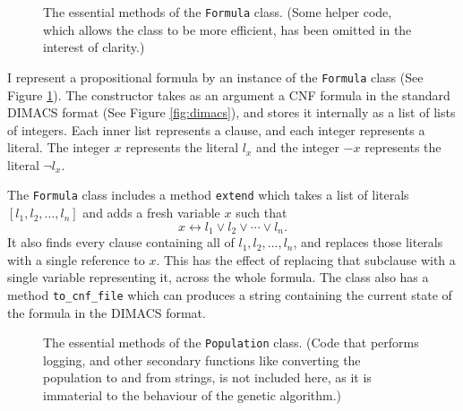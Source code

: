 \documentclass[proof,pdftex,11pt,a4]{article}
\def\code{\lstinline[basicstyle=\textsize\ttfamily]}
\begin{document}
\begin{figure}[p]
  
  \caption{The essential methods of the \code{Formula} class. (Some helper code, which allows the class to be more efficient, has been omitted in the interest of clarity.)}
  \label{fig:formula-class}
\end{figure}

I represent a propositional formula by an instance of the \code{Formula} class (See Figure \ref{fig:formula-class}). The constructor takes as an argument a CNF formula in the standard DIMACS format (See Figure \ref{fig:dimacs}), and stores it internally as a list of lists of integers. Each inner list represents a clause, and each integer represents a literal. The integer $x$ represents the literal $l_x$ and the integer $-x$ represents the literal $\neg l_x$.

The \code{Formula} class includes a method \code{extend} which takes a list of literals $[l_1, l_2, \ldots, l_n]$ and adds a fresh variable $x$ such that
\[x \leftrightarrow l_1 \vee l_2 \vee \cdots \vee l_n.\]
It also finds every clause containing all of $l_1, l_2, \ldots, l_n$, and replaces those literals with a single reference to $x$. This has the effect of replacing that subclause with a single variable representing it, across the whole formula. The class also has a method \code{to_cnf_file} which can produces a string containing the current state of the formula in the DIMACS format.

\begin{figure}[p]
  
  \caption{The essential methods of the \code{Population} class. (Code that performs logging, and other secondary functions like converting the population to and from strings, is not included here, as it is immaterial to the behaviour of the genetic algorithm.)}
  \label{fig:population-class}
\end{figure}
\end{document}
